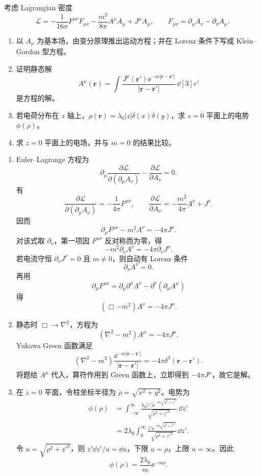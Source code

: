 \begin{question}[Proca 场]
考虑 Lagrangian 密度
\[
  \mathcal L=-\frac{1}{16\pi}F^{\mu\nu}F_{\mu\nu}
  -\frac{m^2}{8\pi}A^\mu A_\mu+J^\mu A_\mu,
  \qquad
  F_{\mu\nu}=\partial_\mu A_\nu-\partial_\nu A_\mu .
\]
\begin{enumerate}
  \item 以 $A_\mu$ 为基本场，由变分原理推出运动方程；并在 Lorenz 条件下写成 Klein--Gordon 型方程。
  \item 证明静态解
  \[
    A^\mu(\mathbf r)=\int\frac{J^\mu(\mathbf r')\ee^{-m|\mathbf r-\mathbf r'|}}{|\mathbf r-\mathbf r'|}\,\dd[3]{r'}
  \]
  是方程的解。
  \item 若电荷分布在 $z$ 轴上，$\rho(\mathbf r)=\lambda_0|z|\delta(x)\delta(y)$，求 $z=0$ 平面上的电势 $\phi(\rho)$。
  \item 求 $z=0$ 平面上的电场，并与 $m=0$ 的结果比较。
\end{enumerate}
\begin{solution}
\begin{enumerate}
  \item Euler--Lagrange 方程为
  \[
    \partial_\mu\frac{\partial\mathcal L}{\partial(\partial_\mu A_\nu)}-
    \frac{\partial\mathcal L}{\partial A_\nu}=0 .
  \]
  有
  \[
    \frac{\partial\mathcal L}{\partial(\partial_\mu A_\nu)}=-\frac{1}{4\pi}F^{\mu\nu},
    \qquad
    \frac{\partial\mathcal L}{\partial A_\nu}=-\frac{m^2}{4\pi}A^\nu+J^\nu .
  \]
  因而
  \[
    \boxed{\partial_\mu F^{\mu\nu}-m^2A^\nu=-4\pi J^\nu} .
  \]
  对该式取 $\partial_\nu$，第一项因 $F^{\mu\nu}$ 反对称而为零，得
  \[
    -m^2\partial_\nu A^\nu=-4\pi\partial_\nu J^\nu .
  \]
  若电流守恒 $\partial_\nu J^\nu=0$ 且 $m\neq0$，则自动有 Lorenz 条件
  \[
    \partial_\nu A^\nu=0 .
  \]
  再用
  \[
    \partial_\mu F^{\mu\nu}=\partial_\mu\partial^\mu A^\nu-
    \partial^\nu(\partial_\mu A^\mu)
  \]
  得
  \[
    \boxed{(\Box-m^2)A^\nu=-4\pi J^\nu} .
  \]

  \item 静态时 $\Box\to\nabla^2$，方程为
  \[
    (\nabla^2-m^2)A^\mu=-4\pi J^\mu .
  \]
  Yukawa Green 函数满足
  \[
    (\nabla^2-m^2)\frac{\ee^{-m|\mathbf r-\mathbf r'|}}{|\mathbf r-\mathbf r'|}
    =-4\pi\delta^3(\mathbf r-\mathbf r') .
  \]
  将题给 $A^\mu$ 代入，算符作用到 Green 函数上，立即得到 $-4\pi J^\mu$，故它是解。

  \item 在 $z=0$ 平面，令柱坐标半径为 $\rho=\sqrt{x^2+y^2}$。电势为
  \[
  \begin{aligned}
    \phi(\rho)&=\int_{-\infty}^{\infty}
    \frac{\lambda_0|z'|\ee^{-m\sqrt{\rho^2+z'^2}}}{\sqrt{\rho^2+z'^2}}\,\dd{z'} \\
    &=2\lambda_0\int_0^\infty
    \frac{z'\ee^{-m\sqrt{\rho^2+z'^2}}}{\sqrt{\rho^2+z'^2}}\,\dd{z'} .
  \end{aligned}
  \]
  令 $u=\sqrt{\rho^2+z'^2}$，则 $z'\dd{z'}/u=\dd{u}$，下限 $u=\rho$，上限 $u=\infty$。因此
  \[
    \boxed{\phi(\rho)=\frac{2\lambda_0}{m}\ee^{-m\rho}} .
  \]


\end{enumerate}
\end{solution}
\end{question}
